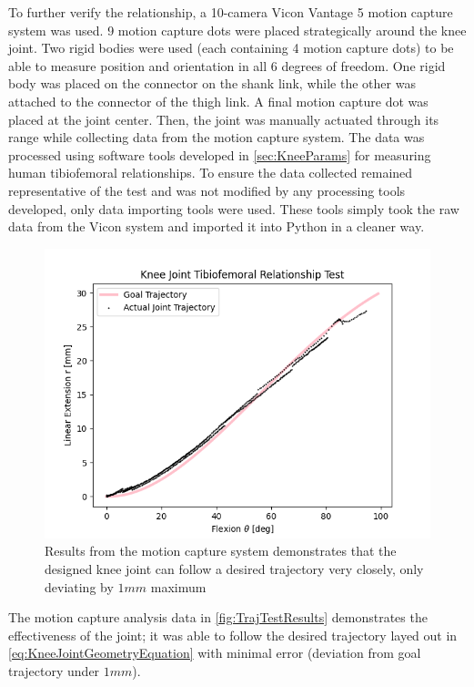 To further verify the relationship, a 10-camera Vicon Vantage 5 motion capture system was used. 9 motion capture dots were placed strategically around the knee joint. Two rigid bodies were used (each containing 4 motion capture dots) to be able to measure position and orientation in all 6 degrees of freedom. One rigid body was placed on the connector on the shank link, while the other was attached to the connector of the thigh link. A final motion capture dot was placed at the joint center. Then, the joint was manually actuated through its range while collecting data from the motion capture system. The data was processed using software tools developed in \autoref{sec:KneeParams} for measuring human tibiofemoral relationships. To ensure the data collected remained representative of the test and was not modified by any processing tools developed, only data importing tools were used. These tools simply took the raw data from the Vicon system and imported it into Python in a cleaner way.

\begin{figure}[ht!]
    \centering
    \includegraphics[width=0.8\linewidth]{Figures/Design/FlexionExtensionKneeJoint.png}
    \caption{Results from the motion capture system demonstrates that the designed knee joint can follow a desired trajectory very closely, only deviating by \(1mm\) maximum}
    \label{fig:TrajTestResults}
\end{figure}

The motion capture analysis data in \autoref{fig:TrajTestResults} demonstrates the effectiveness of the joint; it was able to follow the desired trajectory layed out in \autoref{eq:KneeJointGeometryEquation} with minimal error (deviation from goal trajectory under \(1mm\)). 